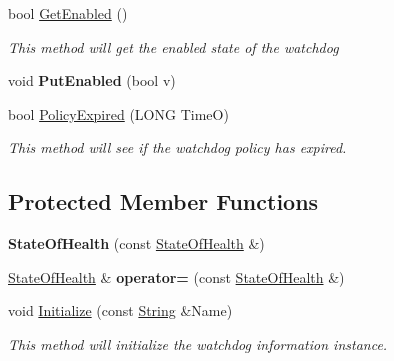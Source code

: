 \begin{DoxyCompactItemize}
bool \hyperlink{class_canberra_1_1_utility_1_1_core_1_1_state_of_health_a3031980a79f1f22480dfc18071dac093_a3031980a79f1f22480dfc18071dac093}{Get\+Enabled} ()
\begin{DoxyCompactList}\small\item\em This method will get the enabled state of the watchdog \end{DoxyCompactList}\item 
\mbox{\label{class_canberra_1_1_utility_1_1_core_1_1_state_of_health_a5b3440569f1ff290ac65b7c6643b92f0}} 
void {\bfseries Put\+Enabled} (bool v)
\item 
bool \hyperlink{class_canberra_1_1_utility_1_1_core_1_1_state_of_health_acf1516a0f54b8ac3e5d05230ba9b3925_acf1516a0f54b8ac3e5d05230ba9b3925}{Policy\+Expired} (L\+O\+NG TimeO)
\begin{DoxyCompactList}\small\item\em This method will see if the watchdog policy has expired. \end{DoxyCompactList}\end{DoxyCompactItemize}
\subsection*{Protected Member Functions}
\begin{DoxyCompactItemize}
\item 
\mbox{\label{class_canberra_1_1_utility_1_1_core_1_1_state_of_health_a11e32924efe20e92579e814a3d26183a}} 
{\bfseries State\+Of\+Health} (const \hyperlink{class_canberra_1_1_utility_1_1_core_1_1_state_of_health}{State\+Of\+Health} \&)
\item 
\mbox{\label{class_canberra_1_1_utility_1_1_core_1_1_state_of_health_aaeb569464177afe415f0b838436c8be7}} 
\hyperlink{class_canberra_1_1_utility_1_1_core_1_1_state_of_health}{State\+Of\+Health} \& {\bfseries operator=} (const \hyperlink{class_canberra_1_1_utility_1_1_core_1_1_state_of_health}{State\+Of\+Health} \&)
\item 
void \hyperlink{class_canberra_1_1_utility_1_1_core_1_1_state_of_health_a5c707d8203b969f0130c64850a31d09d_a5c707d8203b969f0130c64850a31d09d}{Initialize} (const \hyperlink{class_canberra_1_1_utility_1_1_core_1_1_string}{String} \&Name)
\begin{DoxyCompactList}\small\item\em This method will initialize the watchdog information instance. \end{DoxyCompactList}\end{DoxyCompactItemize}
